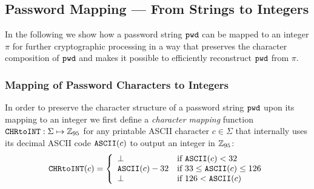 \subsection{Password Mapping --- From Strings to Integers}\label{sec:pwdencoding}
In the following we show how a password string $\mathtt{pwd}$ can be mapped to an integer $\pi$ for further cryptographic processing in a way that preserves the character composition of $\mathtt{pwd}$ and makes it possible to efficiently reconstruct $\mathtt{pwd}$ from $\pi$. 


\subsubsection{Mapping of Password Characters to Integers}
In order to preserve the character structure of a password string $\mathtt{pwd}$ upon its mapping to an integer we first define a \emph{character mapping} function $\texttt{CHRtoINT}:\Sigma\mapsto\mathbb{Z}_{95}$ for any printable \ac{ASCII}  character $c\in\Sigma$ that internally uses its decimal \ac{ASCII}  code $\mathtt{ASCII}(c)$ to output an integer in $\mathbb{Z}_{95}$:
\[
\texttt{CHRtoINT}(c) =
\left\{
	\begin{array}{ll}
		\bot  & \mbox{if } \mathtt{ASCII}(c) < 32 \\
		\mathtt{ASCII}(c)-32 & \mbox{if } 33 \leq \mathtt{ASCII}(c) \leq 126 \\
		\bot & \mbox{if } 126 < \mathtt{ASCII}(c)
	\end{array}
\right.
\]


